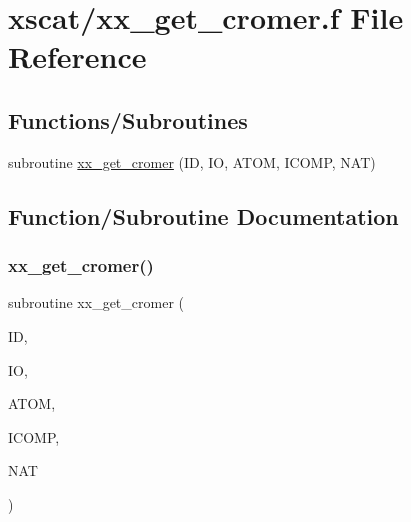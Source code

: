 \hypertarget{xx__get__cromer_8f}{}\section{xscat/xx\+\_\+get\+\_\+cromer.f File Reference}
\label{xx__get__cromer_8f}
\subsection*{Functions/\+Subroutines}
\begin{DoxyCompactItemize}
\item 
subroutine \hyperlink{xx__get__cromer_8f_acc8e082d4af08beb4dcab2e96e351b56}{xx\+\_\+get\+\_\+cromer} (ID, IO, A\+T\+OM, I\+C\+O\+MP, N\+AT)
\end{DoxyCompactItemize}


\subsection{Function/\+Subroutine Documentation}
\mbox{\label{xx__get__cromer_8f_acc8e082d4af08beb4dcab2e96e351b56}} 
\subsubsection{\texorpdfstring{xx\+\_\+get\+\_\+cromer()}{xx\_get\_cromer()}}
{\footnotesize\ttfamily subroutine xx\+\_\+get\+\_\+cromer (\begin{DoxyParamCaption}\item[{integer}]{ID,  }\item[{integer}]{IO,  }\item[{character, dimension(nat)}]{A\+T\+OM,  }\item[{integer, dimension(nat)}]{I\+C\+O\+MP,  }\item[{integer}]{N\+AT }\end{DoxyParamCaption})}

